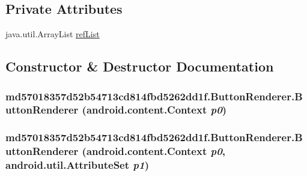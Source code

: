 \subsection*{Private Attributes}
\begin{CompactItemize}
\item 
java.util.ArrayList \hyperlink{classmd57018357d52b54713cd814fbd5262dd1f_1_1_button_renderer_21d4015ec2fa37ea58626d27257f2727}{refList}
\end{CompactItemize}


\subsection{Constructor \& Destructor Documentation}
\hypertarget{classmd57018357d52b54713cd814fbd5262dd1f_1_1_button_renderer_f7305e740bebafe67f3214621b380601}{
\subsubsection[{ButtonRenderer}]{\setlength{\rightskip}{0pt plus 5cm}md57018357d52b54713cd814fbd5262dd1f.ButtonRenderer.ButtonRenderer (android.content.Context {\em p0})}}
\label{classmd57018357d52b54713cd814fbd5262dd1f_1_1_button_renderer_f7305e740bebafe67f3214621b380601}


\hypertarget{classmd57018357d52b54713cd814fbd5262dd1f_1_1_button_renderer_394e9836ab253d8ba9be78efc809e8d2}{
\subsubsection[{ButtonRenderer}]{\setlength{\rightskip}{0pt plus 5cm}md57018357d52b54713cd814fbd5262dd1f.ButtonRenderer.ButtonRenderer (android.content.Context {\em p0}, \/  android.util.AttributeSet {\em p1})}}
\label{classmd57018357d52b54713cd814fbd5262dd1f_1_1_button_renderer_394e9836ab253d8ba9be78efc809e8d2}


